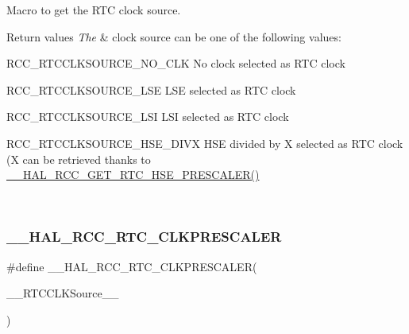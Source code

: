 Macro to get the R\+TC clock source. 


\begin{DoxyRetVals}{Return values}
{\em The} & clock source can be one of the following values\+: \begin{DoxyItemize}
\item R\+C\+C\+\_\+\+R\+T\+C\+C\+L\+K\+S\+O\+U\+R\+C\+E\+\_\+\+N\+O\+\_\+\+C\+LK No clock selected as R\+TC clock \item R\+C\+C\+\_\+\+R\+T\+C\+C\+L\+K\+S\+O\+U\+R\+C\+E\+\_\+\+L\+SE L\+SE selected as R\+TC clock \item R\+C\+C\+\_\+\+R\+T\+C\+C\+L\+K\+S\+O\+U\+R\+C\+E\+\_\+\+L\+SI L\+SI selected as R\+TC clock \item R\+C\+C\+\_\+\+R\+T\+C\+C\+L\+K\+S\+O\+U\+R\+C\+E\+\_\+\+H\+S\+E\+\_\+\+D\+I\+VX H\+SE divided by X selected as R\+TC clock (X can be retrieved thanks to \mbox{\hyperlink{group___r_c_c___internal___r_t_c___clock___configuration_ga85dc62f0fcb14981c47d7f7da25e26d6}{\+\_\+\+\_\+\+H\+A\+L\+\_\+\+R\+C\+C\+\_\+\+G\+E\+T\+\_\+\+R\+T\+C\+\_\+\+H\+S\+E\+\_\+\+P\+R\+E\+S\+C\+A\+L\+E\+R()}} \end{DoxyItemize}
\\
\hline
\end{DoxyRetVals}
\mbox{\label{group___r_c_c___internal___r_t_c___clock___configuration_ga7e10e306e7d9f3cd59d30dcb2c9cf61d}} 
\subsubsection{\texorpdfstring{\+\_\+\+\_\+\+H\+A\+L\+\_\+\+R\+C\+C\+\_\+\+R\+T\+C\+\_\+\+C\+L\+K\+P\+R\+E\+S\+C\+A\+L\+ER}{\_\_HAL\_RCC\_RTC\_CLKPRESCALER}}
{\footnotesize\ttfamily \#define \+\_\+\+\_\+\+H\+A\+L\+\_\+\+R\+C\+C\+\_\+\+R\+T\+C\+\_\+\+C\+L\+K\+P\+R\+E\+S\+C\+A\+L\+ER(\begin{DoxyParamCaption}\item[{}]{\+\_\+\+\_\+\+R\+T\+C\+C\+L\+K\+Source\+\_\+\+\_\+ }\end{DoxyParamCaption})}

